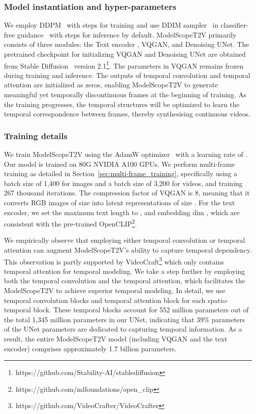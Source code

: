 \subsubsection{Model instantiation and hyper-parameters}
We employ DDPM~\cite{ho2020denoising} with  steps for training and use DDIM sampler~\cite{song2020denoising} in classifier-free guidance~\cite{ho2022classifier} with  steps for inference by default.
ModelScopeT2V primarily consists of three modules: the Text encoder , VQGAN, and Denoising UNet. 
The pretrained checkpoint for initializing VQGAN and Denoising UNet are obtained from Stable Diffusion~\cite{rombach2022high} version 2.1\footnote{https://github.com/Stability-AI/stablediffusion}.
The parameters in VQGAN remains frozen during training and inference.
The outputs of temporal convolution and temporal attention are initialized as zeros, enabling ModelScopeT2V to generate meaningful yet temporally discontinuous frames at the beginning of training.
As the training progresses, the temporal structures will be optimized to learn the temporal correspondence between frames, thereby synthesising continuous videos.



\subsubsection{Training details}

We train ModelScopeT2V using the AdamW optimizer~\cite{loshchilov2017AdamW} with a learning rate of .
Our model is trained on 80G NVIDIA A100 GPUs.
We perform multi-frame training as detailed in Section~\ref{sec:multi-frame_training}, specifically using a batch size of 1,400 for images and a batch size of 3,200 for videos, and training 267 thousand iterations. 
The compression factor of VQGAN is 8, meaning that it converts RGB images of size  into latent representations of size  .
For the text encoder, we set the maximum text length to , and embedding dim , which are consistent with the pre-trained OpenCLIP\footnote{https://github.com/mlfoundations/open\_clip}.


We empirically observe that employing either temporal convolution or temporal attention can augment ModelScopeT2V's ability to capture temporal dependency.
This observation is partly supported by VideoCraft\footnote{https://github.com/VideoCrafter/VideoCrafter} which only contains temporal attention for temporal modeling.
We take a step further by employing both the temporal convolution and the temporal attention, which facilitates the ModelScopeT2V to achieve superior temporal modeling.
In detail, we use  temporal convolution blocks and  temporal attention block for each spatio-temporal block.
These temporal blocks account for 552 million parameters out of the total 1,345 million parameters in our UNet, indicating that 39\% parameters of the UNet parameters are dedicated to capturing temporal information. 
As a result, the entire ModelScopeT2V model (including VQGAN and the text encoder) comprises approximately 1.7 billion parameters.


